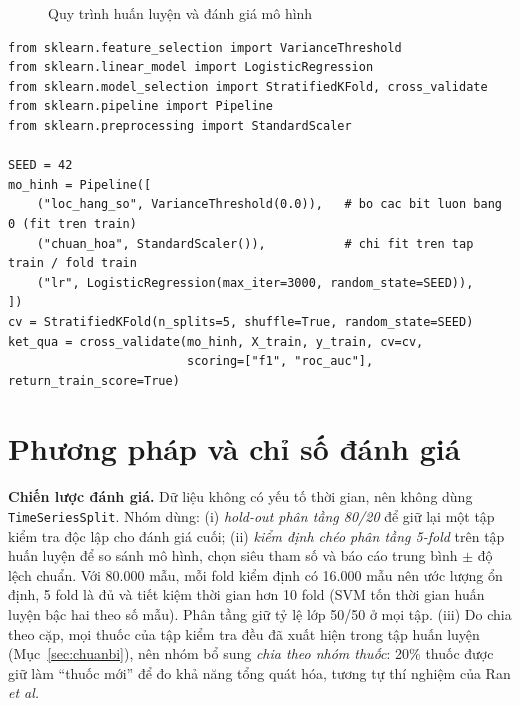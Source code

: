 \documentclass[12pt,a4paper,oneside]{report}
\begin{document}
\begin{figure}[H]
  \caption{Quy trình huấn luyện và đánh giá mô hình}
  \label{fig:quytrinhhuanluyen}
\end{figure}

\begin{lstlisting}[caption={Pipeline tiền xử lý và kiểm định chéo (dự kiến cho Bài kiểm tra 2)},label={lst:pipeline}]
from sklearn.feature_selection import VarianceThreshold
from sklearn.linear_model import LogisticRegression
from sklearn.model_selection import StratifiedKFold, cross_validate
from sklearn.pipeline import Pipeline
from sklearn.preprocessing import StandardScaler

SEED = 42
mo_hinh = Pipeline([
    ("loc_hang_so", VarianceThreshold(0.0)),   # bo cac bit luon bang 0 (fit tren train)
    ("chuan_hoa", StandardScaler()),           # chi fit tren tap train / fold train
    ("lr", LogisticRegression(max_iter=3000, random_state=SEED)),
])
cv = StratifiedKFold(n_splits=5, shuffle=True, random_state=SEED)
ket_qua = cross_validate(mo_hinh, X_train, y_train, cv=cv,
                         scoring=["f1", "roc_auc"], return_train_score=True)
\end{lstlisting}

\section{Phương pháp và chỉ số đánh giá}
\label{sec:danhgia}
\textbf{Chiến lược đánh giá.} Dữ liệu không có yếu tố thời gian, nên không dùng
\texttt{TimeSeriesSplit}. Nhóm dùng: (i) \emph{hold-out phân tầng 80/20} để giữ
lại một tập kiểm tra độc lập cho đánh giá cuối; (ii) \emph{kiểm định chéo phân
tầng 5-fold} trên tập huấn luyện để so sánh mô hình, chọn siêu tham số và báo
cáo trung bình $\pm$ độ lệch chuẩn. Với 80.000 mẫu, mỗi fold kiểm định có 16.000
mẫu nên ước lượng ổn định, 5 fold là đủ và tiết kiệm thời gian hơn 10 fold
(SVM tốn thời gian huấn luyện bậc hai theo số mẫu). Phân tầng giữ tỷ lệ lớp 50/50
ở mọi tập. (iii) Do chia theo cặp, mọi thuốc của tập kiểm tra đều đã xuất hiện
trong tập huấn luyện (Mục~\ref{sec:chuanbi}), nên nhóm bổ sung \emph{chia theo
nhóm thuốc}: 20\% thuốc được giữ làm ``thuốc mới'' để đo khả năng tổng quát hóa,
tương tự thí nghiệm của Ran \textit{et al.}
\end{document}
